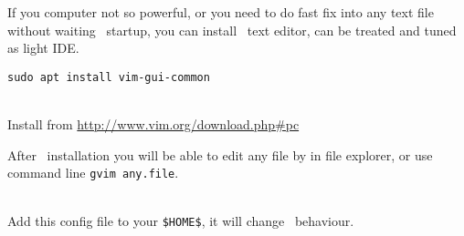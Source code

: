 
\noindent
If you computer not so powerful, or you need to do fast fix into any text file
without waiting \eclipse\ startup, you can install \gvim\ text editor, can
be treated and tuned as light IDE.

\secp{\linux}

\begin{verbatim}
sudo apt install vim-gui-common
\end{verbatim}

\secp{\win}\ \\

Install from \url{http://www.vim.org/download.php#pc}

\bigskip
After \gvim\ installation you will be able to edit any file by  in file explorer, or use command line \verb$gvim any.file$.

\ \\

Add this config file to your \verb|$HOME$|, it will change \gvim\ behaviour.
